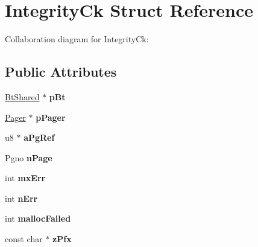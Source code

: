 \hypertarget{structIntegrityCk}{}\section{Integrity\+Ck Struct Reference}
\label{structIntegrityCk}


Collaboration diagram for Integrity\+Ck\+:
\subsection*{Public Attributes}
\begin{DoxyCompactItemize}
\item 
\hyperlink{structBtShared}{Bt\+Shared} $\ast$ {\bfseries p\+Bt}\hypertarget{structIntegrityCk_a65f03f54514f504bd871bb2ccd3da188}{}\label{structIntegrityCk_a65f03f54514f504bd871bb2ccd3da188}

\item 
\hyperlink{structPager}{Pager} $\ast$ {\bfseries p\+Pager}\hypertarget{structIntegrityCk_a87e7f8b012b61b61fae359269cbacce4}{}\label{structIntegrityCk_a87e7f8b012b61b61fae359269cbacce4}

\item 
u8 $\ast$ {\bfseries a\+Pg\+Ref}\hypertarget{structIntegrityCk_a317f80aef5842ad69df75b55e14118d1}{}\label{structIntegrityCk_a317f80aef5842ad69df75b55e14118d1}

\item 
Pgno {\bfseries n\+Page}\hypertarget{structIntegrityCk_a04f496ef7239aea6dccb6a861bb5a798}{}\label{structIntegrityCk_a04f496ef7239aea6dccb6a861bb5a798}

\item 
int {\bfseries mx\+Err}\hypertarget{structIntegrityCk_a9daa97cdcb1366c503451ab2af9e7ba6}{}\label{structIntegrityCk_a9daa97cdcb1366c503451ab2af9e7ba6}

\item 
int {\bfseries n\+Err}\hypertarget{structIntegrityCk_a52c815a1d19be87d0ab4dc0a4e4d38e2}{}\label{structIntegrityCk_a52c815a1d19be87d0ab4dc0a4e4d38e2}

\item 
int {\bfseries malloc\+Failed}\hypertarget{structIntegrityCk_a8e448c1d6483a0326a7ec39291782030}{}\label{structIntegrityCk_a8e448c1d6483a0326a7ec39291782030}

\item 
const char $\ast$ {\bfseries z\+Pfx}\hypertarget{structIntegrityCk_a126e42d437777815b1c1d74bcacb3b38}{}\label{structIntegrityCk_a126e42d437777815b1c1d74bcacb3b38}


\end{DoxyCompactItemize}
